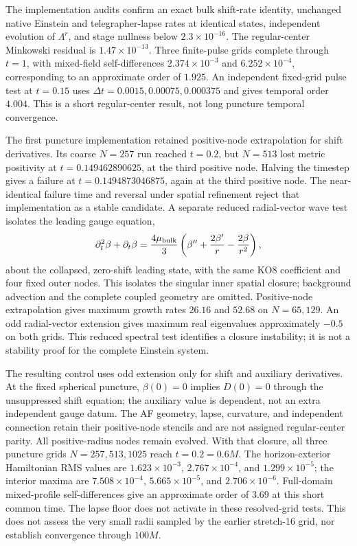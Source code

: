 \documentclass[11pt]{article}
\begin{document}
The implementation audits confirm an exact bulk shift-rate identity, unchanged native Einstein and telegrapher-lapse rates at identical states, independent evolution of $\Lambda^r$, and stage nullness below $2.3\times10^{-16}$. The regular-center Minkowski residual is $1.47\times10^{-13}$. Three finite-pulse grids complete through $t=1$, with mixed-field self-differences $2.374\times10^{-3}$ and $6.252\times10^{-4}$, corresponding to an approximate order of $1.925$. An independent fixed-grid pulse test at $t=0.15$ uses $\Delta t=0.0015,0.00075,0.000375$ and gives temporal order $4.004$. This is a short regular-center result, not long puncture temporal convergence.

The first puncture implementation retained positive-node extrapolation for shift derivatives. Its coarse $N=257$ run reached $t=0.2$, but $N=513$ lost metric positivity at $t=0.149462890625$, at the third positive node. Halving the timestep gives a failure at $t=0.1494873046875$, again at the third positive node. The near-identical failure time and reversal under spatial refinement reject that implementation as a stable candidate. A separate reduced radial-vector wave test isolates the leading gauge equation,
\begin{equation}
 \partial_t^2\beta+\partial_t\beta=\frac{4\mu_{\rm bulk}}3
 \left(\beta''+\frac{2\beta'}r-\frac{2\beta}{r^2}\right),
\end{equation}
about the collapsed, zero-shift leading state, with the same KO8 coefficient and four fixed outer nodes. This isolates the singular inner spatial closure; background advection and the complete coupled geometry are omitted. Positive-node extrapolation gives maximum growth rates $26.16$ and $52.68$ on $N=65,129$. An odd radial-vector extension gives maximum real eigenvalues approximately $-0.5$ on both grids. This reduced spectral test identifies a closure instability; it is not a stability proof for the complete Einstein system.

The resulting control uses odd extension only for shift and auxiliary derivatives. At the fixed spherical puncture, $\beta(0)=0$ implies $D(0)=0$ through the unsuppressed shift equation; the auxiliary value is dependent, not an extra independent gauge datum. The AF geometry, lapse, curvature, and independent connection retain their positive-node stencils and are not assigned regular-center parity. All positive-radius nodes remain evolved. With that closure, all three puncture grids $N=257,513,1025$ reach $t=0.2=0.6M$. The horizon-exterior Hamiltonian RMS values are $1.623\times10^{-3}$, $2.767\times10^{-4}$, and $1.299\times10^{-5}$; the interior maxima are $7.508\times10^{-4}$, $5.665\times10^{-5}$, and $2.706\times10^{-6}$. Full-domain mixed-profile self-differences give an approximate order of $3.69$ at this short common time. The lapse floor does not activate in these resolved-grid tests. This does not assess the very small radii sampled by the earlier stretch-16 grid, nor establish convergence through $100M$.
\end{document}
